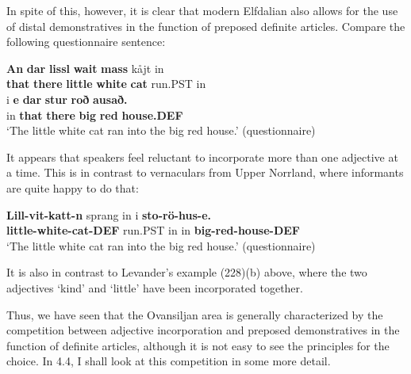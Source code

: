{
\z 
\z 

In spite of this, however, it is clear that modern Elfdalian also allows for the use of distal demonstratives in the function of preposed definite articles. Compare the following questionnaire sentence:


\ea\label{}
\gll \textbf{An} \textbf{dar} \textbf{lissl} \textbf{wait} \textbf{mass} kåjt  in\\
\textbf{that} \textbf{there} \textbf{little} \textbf{white} \textbf{cat} run.PST  in\\
\gll i  \textbf{e}\textbf{  dar}\textbf{  stur}\textbf{  roð}\textbf{  ausað.}\\
in  \textbf{that} \textbf{there} \textbf{big} \textbf{red} \textbf{house.DEF}\\
\glt ‘The little white cat ran into the big red house.’ (questionnaire)
\z

It appears that speakers feel reluctant to incorporate more than one adjective at a time. This is in contrast to vernaculars from Upper Norrland, where informants are quite happy to do that:


\ea\label{}
\gll \textbf{Lill-vit-katt-n} sprang  in  i  \textbf{sto-rö-hus-e.}\\
\textbf{little-white-cat-DEF} run.PST  in  in  \textbf{big-red-house-DEF}\\
\glt ‘The little white cat ran into the big red house.’ (questionnaire)
\z

It is also in contrast to Levander’s example (228)(b) above, where the two adjectives  ‘kind’ and  ‘little’ have been incorporated together. 


Thus, we have seen that the Ovansiljan area is generally characterized by the competition between adjective incorporation and preposed demonstratives in the function of definite articles, although it is not easy to see the principles for the choice. In 4.4, I shall look at this competition in some more detail.

}
